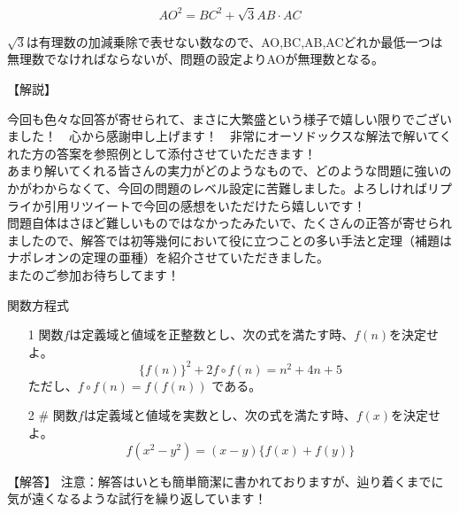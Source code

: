 \documentclass[a4paper,fleqn,dvipdfmx]{jsarticle}
\begin{document}
$$AO^2=BC^2+\sqrt{3}AB\cdot AC$$

$\sqrt{3}$は有理数の加減乗除で表せない数なので、AO,BC,AB,ACどれか最低一つは無理数でなければならないが、問題の設定よりAOが無理数となる。


\begin{flushleft}
【解説】
\end{flushleft}

今回も色々な回答が寄せられて、まさに大繁盛という様子で嬉しい限りでございました！　心から感謝申し上げます！　非常にオーソドックスな解法で解いてくれた方の答案を参照例として添付させていただきます！\\
あまり解いてくれる皆さんの実力がどのようなもので、どのような問題に強いのかがわからなくて、今回の問題のレベル設定に苦難しました。よろしければリプライか引用リツイートで今回の感想をいただけたら嬉しいです！\\
問題自体はさほど難しいものではなかったみたいで、たくさんの正答が寄せられましたので、解答では初等幾何において役に立つことの多い手法と定理（補題はナポレオンの定理の亜種）を紹介させていただきました。\\
またのご参加お待ちしてます！



\newpage

\begin{itembox}[l]{関数方程式}

\begin{itemize}
    \item [1] 
        関数$f$は定義域と値域を正整数とし、次の式を満たす時、$f(n)$を決定せよ。
        $$\{f(n)\}^2+2f\circ f(n)=n^2+4n+5$$
        ただし、$f\circ f(n)=f(f(n))$ である。
    
    \item [2] \#
    関数$f$は定義域と値域を実数とし、次の式を満たす時、$f(x)$を決定せよ。
    $$f(x^2-y^2)=(x-y)\{f(x)+f(y)\}$$
\end{itemize}
\end{itembox}


\begin{flushleft}
【解答】
注意：解答はいとも簡単簡潔に書かれておりますが、辿り着くまでに気が遠くなるような試行を繰り返しています！
\end{flushleft}
\end{document}

